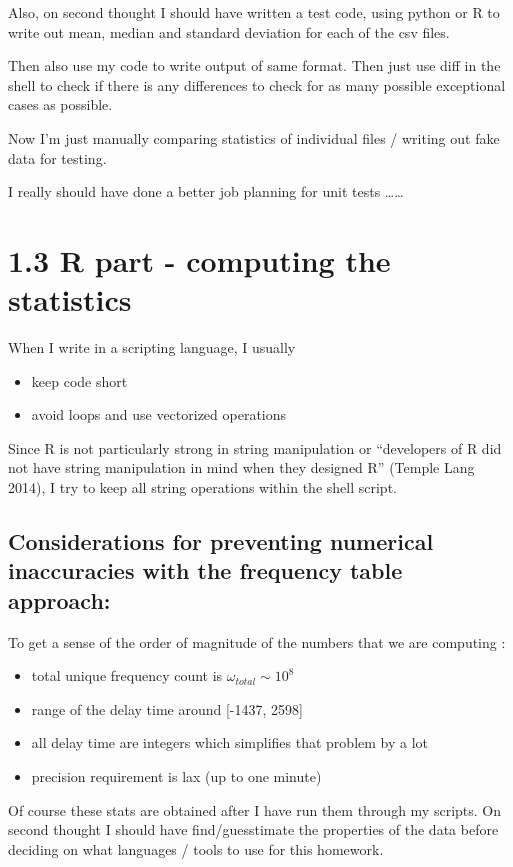 \documentclass[letterpaper,10pt,english]{/usr/local/lib/python2.7/dist-packages/sphinx/texinputs/sphinxhowto}
\begin{document}
Also, on second thought I should have written a test code, using python
or R to write out mean, median and standard deviation for each of the
csv files.

Then also use my code to write output of same format. Then just use diff
in the shell to check if there is any differences to check for as many
possible exceptional cases as possible.

Now I'm just manually comparing statistics of individual files / writing
out fake data for testing.

I really should have done a better job planning for unit tests
\ldots{}\ldots{}\section{1.3 R part - computing the statistics}When I write in a scripting language, I usually

\begin{itemize}
\itemsep1pt\parskip0pt
\item
  keep code short
\item
  avoid loops and use vectorized operations
\end{itemize}

Since R is not particularly strong in string manipulation or
``developers of R did not have string manipulation in mind when they
designed R'' (Temple Lang 2014), I try to keep all string operations
within the shell script.\subsection{Considerations for preventing numerical inaccuracies with the frequency
table approach:}To get a sense of the order of magnitude of the numbers that we are
computing :

\begin{itemize}
\itemsep1pt\parskip0pt
\item
  total unique frequency count is $\omega_{total} \sim 10^8$
\item
  range of the delay time around {[}-1437, 2598{]}
\item
  all delay time are integers which simplifies that problem by a lot
\item
  precision requirement is lax (up to one minute)
\end{itemize}

Of course these stats are obtained after I have run them through my
scripts. On second thought I should have find/guesstimate the properties
of the data before deciding on what languages / tools to use for this
homework.
\end{document}
